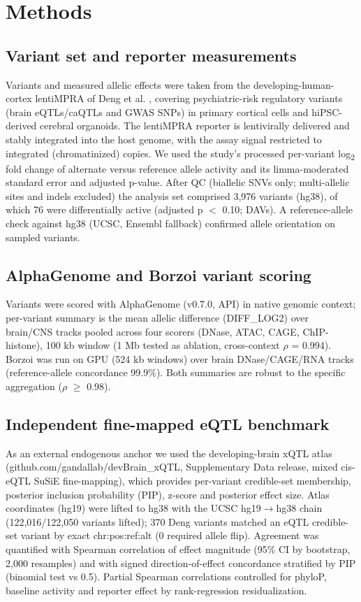 \documentclass[9pt,twocolumn]{article}
\begin{document}
\section{Methods}


\subsection{Variant set and reporter measurements}

Variants and measured allelic effects were taken from the developing-human-cortex lentiMPRA of Deng et al. \cite{r1}, covering psychiatric-risk regulatory variants (brain eQTLs/caQTLs and GWAS SNPs) in primary cortical cells and hiPSC-derived cerebral organoids. The lentiMPRA reporter is lentivirally delivered and stably integrated into the host genome, with the assay signal restricted to integrated (chromatinized) copies. We used the study's processed per-variant log\textsubscript{2} fold change of alternate versus reference allele activity and its limma-moderated standard error and adjusted p-value. After QC (biallelic SNVs only; multi-allelic sites and indels excluded) the analysis set comprised 3,976 variants (hg38), of which 76 were differentially active (adjusted p $<$ 0.10; DAVs). A reference-allele check against hg38 (UCSC, Ensembl fallback) confirmed allele orientation on sampled variants.


\subsection{AlphaGenome and Borzoi variant scoring}

Variants were scored with AlphaGenome (v0.7.0, API) in native genomic context; per-variant summary is the mean allelic difference (DIFF_LOG2) over brain/CNS tracks pooled across four scorers (DNase, ATAC, CAGE, ChIP-histone), 100 kb window (1 Mb tested as ablation, cross-context $\rho$ = 0.994). Borzoi was run on GPU (524 kb windows) over brain DNase/CAGE/RNA tracks (reference-allele concordance 99.9\%). Both summaries are robust to the specific aggregation ($\rho$ $\ge$ 0.98).


\subsection{Independent fine-mapped eQTL benchmark}

As an external endogenous anchor we used the developing-brain xQTL atlas \cite{r14} (github.com/gandallab/devBrain_xQTL, Supplementary Data release, mixed cis-eQTL SuSiE fine-mapping), which provides per-variant credible-set membership, posterior inclusion probability (PIP), z-score and posterior effect size. Atlas coordinates (hg19) were lifted to hg38 with the UCSC hg19$\rightarrow$hg38 chain (122,016/122,050 variants lifted); 370 Deng variants matched an eQTL credible-set variant by exact chr:pos:ref:alt (0 required allele flip). Agreement was quantified with Spearman correlation of effect magnitude (95\% CI by bootstrap, 2,000 resamples) and with signed direction-of-effect concordance stratified by PIP (binomial test vs 0.5). Partial Spearman correlations controlled for phyloP, baseline activity and reporter effect by rank-regression residualization.
\end{document}
